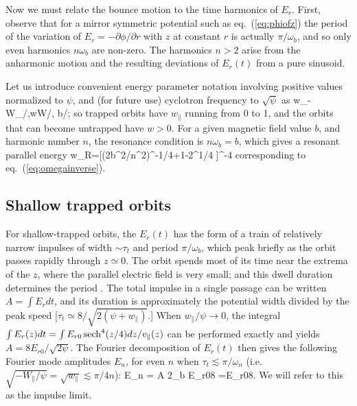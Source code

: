 \documentclass{agujournal2019}
\let\oldequation\equation
\let\oldendequation\endequation
\renewenvironment{equation}
  {\linenomathNonumbers\oldequation}
  {\oldendequation\endlinenomath}
\def\citep{\cite}
\def\wp{w_\parallel}
\def\wr{w_{\parallel R}}
\begin{document}
Now we must relate the bounce motion to the time harmonics of
$E_r$. First, observe that for a mirror symmetric potential such as
eq.\ (\ref{eq:phiofz}) the period of the variation of
$E_r=-\partial \phi/\partial r$ with $z$ at constant $r$ is actually
$\pi/\omega_b$, and so only even harmonics $n\omega_b$ are non-zero.
The harmonics $n>2$ arise from the anharmonic motion and the resulting
deviations of $E_r(t)$ from a pure sinusoid.

Let us introduce convenient energy parameter notation involving
positive values normalized to
$\psi$, and (for future use) cyclotron frequency to $\sqrt\psi$ as
\begin{equation}
  \label{eq:scaledtopsi}
  w_\parallel\equiv-W_\parallel/\psi,\qquad w\equiv W/\psi,
  \qquad b\equiv\Omega/\sqrt\psi;
\end{equation}
so trapped orbits have
$\wp$ running from 0 to 1, and the orbits that can become untrapped
have $w>0$. For a given magnetic field value
$b$, and harmonic number $n$, the resonance condition is $n\omega_b=b$,
which gives a resonant parallel energy 
\begin{equation}
  \label{eq:resen}
  \wr=[(2b^2/n^2)^{-1/4}+1-2^{1/4} ]^{-4} %
\end{equation}
corresponding to eq.\ (\ref{eq:omegainverse}).

\subsection{Shallow trapped orbits}
\label{impulsesec}

For shallow-trapped orbits, the $E_r(t)$ has the form of a train of
relatively narrow impulses of width $\sim \tau_t$ and period
$\pi/\omega_b$, which peak briefly as the orbit passes rapidly through
$z\simeq 0$. The orbit spends most of its time near the extrema of the
$z$, where the parallel electric field is very small; and this dwell duration
determines the period \citep{Hutchinson2019a}. The total impulse in a single passage can
be written $A=\int E_r dt$, and its duration is approximately the
potential width divided by the peak speed
[$\tau_t\simeq 8/\sqrt{2(\psi+\wp)}$.] When $\wp/\psi\to 0$,  the integral
$\int E_r(z)dt=\int E_{r0}\,{\rm sech}^4(z/4)dz/v_\parallel(z)$ can be
performed exactly and yields $A=8E_{r0}/\sqrt{2\psi}$. The Fourier
decomposition of $E_r(t)$ then gives the following Fourier mode
amplitudes $E_n$, for even $n$ when $\tau_t\lesssim\pi/\omega_n$ (i.e.\
$\sqrt{-W_\parallel/\psi}=\sqrt{\wp}\lesssim\pi/4n$):
\begin{equation}
  \label{eq:fouriermodes}
  E_n = A {2\omega_b\over \pi} \simeq
  E_{r0}{8\over\pi}
  =E_{r0}{8\over\pi}\sqrt{\wp}.
\end{equation}
We will refer to this as the impulse limit.
\end{document}
